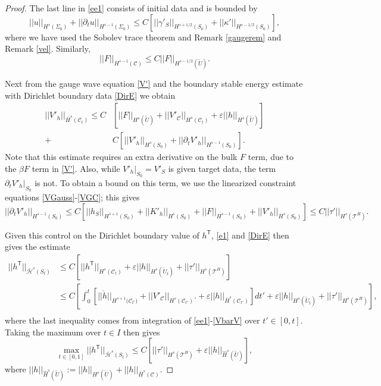\documentclass[10pt]{amsart}
\renewcommand{\b}{\beta}
\newcommand{\g}{\gamma}
\newcommand{\e}{\varepsilon}
\newcommand{\Si}{\Sigma}
\renewcommand{\k}{\kappa}
\newcommand{\cC}{{\mathcal C}}
\newcommand{\cT}{{\mathcal T}}
\newcommand{\cH}{{\mathcal H}}
\newcommand{\tT}{\mathsf{T}}
\newcommand{\be}{\begin{equation}}
\newcommand{\ee}{\end{equation}}
\newcommand{\p}{\partial}
\renewcommand{\hat}{\widehat}
\newcommand{\<}{\langle}
\renewcommand{\>}{\rangle}
\newcommand{\w}{\widetilde}
\theoremstyle{plain}
\theoremstyle{remark}
\theoremstyle{definition}
\numberwithin{equation}{section}
\begin{document}
\begin{proof}
  The last line in \eqref{ee1} consists of initial data and is bounded by 
$$||u||_{H^s(\Si_0)} + ||\p_t u||_{H^{s-1}(\Si_0)} \leq C[||\g'_S||_{H^{s+1/2}(S_0)} + ||\k'||_{H^{s-1/2}(S_0)}],$$
where we have used the Sobolev trace theorem and Remark \ref{gaugerem} and Remark \ref{vel}. Similarly, 
$$||F||_{H^{s-1}(\cC)} \leq C ||F||_{H^{s-1/2}(\w U)}.$$ 

   Next from the gauge wave equation \eqref{V'} and the boundary stable energy estimate with Dirichlet boundary data \eqref{DirE} we obtain 
\be \label{VbarV}
\begin{split}
||V'_h||_{\bar H^s(\cC_t)} \leq C&[ ||F||_{H^s(\w U)} + ||V'_{\cC}||_{H^s(\cC_t)} + \e||h||_{H^s(\w U)} ]\\
+ &C[||V'_h||_{H^s(S_0)} +  ||\p_t V'_h||_{H^{s-1}(S_0)} ]. 
\end{split}
\ee
Note that this estimate requires an extra derivative on the bulk $F$ term, due to the $\b F$ term in \eqref{V'}. Also, while $V'_h |_{S_0} = V'_S$ 
is given target data, the term $\p_t V'_h | _{S_0}$ is not. To obtain a bound on this term, we use the linearized constraint equations \eqref{VGauss}-\eqref{VGC}; 
this gives 
$$||\p_t V'_h||_{H^{s-1}(S_0)} \leq C[||h_S||_{H^{s+1}(S_0)} + ||K'_h||_{H^s(S_0)} +||F||_{H^{s-1}(S_0)} + ||V'_h||_{H^s(S_0)} ] \leq C||\tau'||_{H^s(\cT^H)}.$$

Given this control on the Dirichlet boundary value of $h^{\tT}$, \eqref{e1} and \eqref{DirE} then gives the estimate 
\be \label{ee2}
\begin{split}
||h^{\tT}||_{\bar \cH^s(S_t)} & \leq  C[||h^{\tT}||_{H^s(\cC_t)} + \e ||h||_{H^s(\w U_t)} + ||\tau'||_{H^s(\cT^H)}] \\
& \leq C[\int_0^t [ ||\ring{h}||_{H^{s+1}({\cC_{t'})}} +||V'_{\cC}||_{H^s(\cC_{t'})}.+ \e ||h||_{\bar H^s(\cC_{t'})} ]dt' +  \e ||h||_{H^s(\w U_t)} + ||\tau'||_{H^s(\cT^H)}], \\
\end{split}
\ee
where the last inequality comes from integration of \eqref{ee1}-\eqref{VbarV} over $t' \in [0,t]$. 
Taking the maximum over $t \in I$ then gives 
\be \label{ee2.1}
\max_{t\in [0,1]} ||h^{\tT}||_{\bar \cH^s(S_t)} \leq C[ ||\tau'||_{H^s(\cT^H)} + \e ||h||_{\hat H^s(\w U)}],
\ee
where $||h||_{\hat H^s(\w U)} :=  ||h||_{H^s(\w U)} + ||h||_{\bar H^s(\cC)}$. 


\end{proof}
\end{document}
